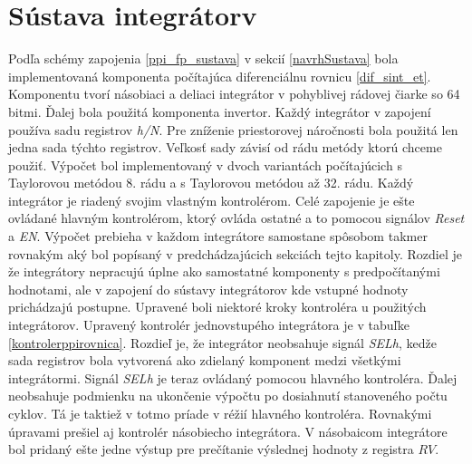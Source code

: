 \section{Sústava integrátorv} \label{impl_rovnice}
Podľa schémy zapojenia  \ref{ppi_fp_sustava} v sekcií \ref{navrhSustava} bola implementovaná komponenta počítajúca diferenciálnu rovnicu \ref{dif_sint_et}. Komponentu tvorí násobiaci a deliaci integrátor v pohyblivej rádovej čiarke so 64 bitmi. Ďalej bola použitá komponenta invertor. Každý integrátor v zapojení používa sadu registrov \textit{h/N}. Pre zníženie priestorovej náročnosti bola použitá len jedna sada týchto registrov. Veľkosť sady závisí od rádu metódy ktorú chceme použiť. Výpočet bol implementovaný v dvoch variantách počítajúcich s Taylorovou metódou 8. rádu a s Taylorovou metódou až 32. rádu.
Každý integrátor je riadený svojim vlastným kontrolérom. Celé zapojenie je ešte ovládané hlavným kontrolérom, ktorý ovláda ostatné a to pomocou signálov \textit{Reset} a \textit{EN}. Výpočet prebieha v každom integrátore samostane spôsobom takmer rovnakým aký bol popísaný v predchádzajúcich sekciách tejto kapitoly. Rozdiel je že integrátory nepracujú úplne ako samostatné komponenty s predpočítanými hodnotami, ale v zapojení do sústavy integrátorov kde vstupné hodnoty prichádzajú postupne. Upravené boli niektoré kroky kontroléra u použitých integrátorov. Upravený kontrolér jednovstupého integrátora je v tabuľke \ref{kontrolerppirovnica}. Rozdieľ je, že  integrátor neobsahuje signál \textit{SELh}, kedže sada registrov bola vytvorená ako zdielaný komponent medzi všetkými integrátormi. Signál \textit{SELh} je teraz ovládaný pomocou hlavného kontroléra. Ďalej neobsahuje podmienku na ukončenie výpočtu po dosiahnutí stanoveného počtu cyklov. Tá je  taktiež v totmo príade v réžií hlavného kontroléra. Rovnakými úpravami prešiel aj kontrolér násobiecho integrátora. V násobaicom integrátore bol pridaný ešte jedne výstup pre prečítanie výslednej hodnoty z registra $ RV $. 


